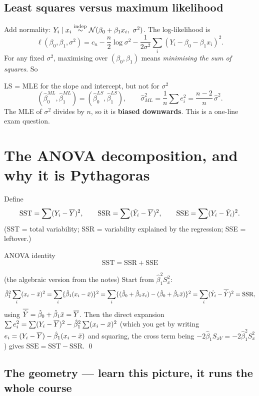 \documentclass[11pt]{article}
\begin{document}
\subsection{Least squares versus maximum likelihood}

Add normality: $Y_i \mid x_i \overset{\text{indep}}{\sim} \mathcal{N}(\beta_0+\beta_1x_i,\ \sigma^2)$. The log-likelihood is
\[
  \ell(\beta_0,\beta_1,\sigma^2) = c_n - \frac{n}{2}\log\sigma^2
  - \frac{1}{2\sigma^2}\sum_i (Y_i-\beta_0-\beta_1x_i)^2 .
\]
For any fixed $\sigma^2$, maximising over $(\beta_0,\beta_1)$ means \emph{minimising the sum
of squares}. So

\begin{idea}{LS = MLE for the slope and intercept, but not for $\sigma^2$}
\[
  (\hat\beta_0^{ML},\hat\beta_1^{ML}) = (\hat\beta_0^{LS},\hat\beta_1^{LS}),
  \qquad
  \hat\sigma^2_{ML}=\frac1n\sum e_i^2 = \frac{n-2}{n}\,\hat\sigma^2 .
\]
The MLE of $\sigma^2$ divides by $n$, so it is \textbf{biased downwards}. This is a
one-line exam question.
\end{idea}

\section{The ANOVA decomposition, and why it is Pythagoras}

Define
\[
  \mathrm{SST}=\sum(Y_i-\overline{Y})^2,\qquad
  \mathrm{SSR}=\sum(\hat Y_i-\overline{Y})^2,\qquad
  \mathrm{SSE}=\sum(Y_i-\hat Y_i)^2 .
\]
(SST = total variability; SSR = variability explained by the regression; SSE = leftover.)

\begin{idea}{ANOVA identity}
\[
  \boxed{\ \mathrm{SST}=\mathrm{SSR}+\mathrm{SSE}\ }
\]
\end{idea}

\prf (the algebraic version from the notes) Start from $\hat\beta_1^2 S_x^2$:
\[
  \hat\beta_1^2\sum_i (x_i-\bar{x})^2 = \sum_i \{\hat\beta_1(x_i-\bar{x})\}^2
  = \sum_i \{(\hat\beta_0+\hat\beta_1x_i)-(\hat\beta_0+\hat\beta_1\bar{x})\}^2
  = \sum_i (\hat Y_i - \overline{\hat Y})^2 = \mathrm{SSR},
\]
using $\overline{\hat Y}=\hat\beta_0+\hat\beta_1\bar{x}=\overline{Y}$. Then the direct expansion
$\sum e_i^2 = \sum(Y_i-\overline{Y})^2 - \hat\beta_1^2\sum(x_i-\bar{x})^2$ (which you get by writing
$e_i=(Y_i-\overline{Y})-\hat\beta_1(x_i-\bar{x})$ and squaring, the cross term being
$-2\hat\beta_1 S_{xY}=-2\hat\beta_1^2 S_x^2$) gives $\mathrm{SSE}=\mathrm{SST}-\mathrm{SSR}$. \qed

\subsection{The geometry --- learn this picture, it runs the whole course}
\end{document}
